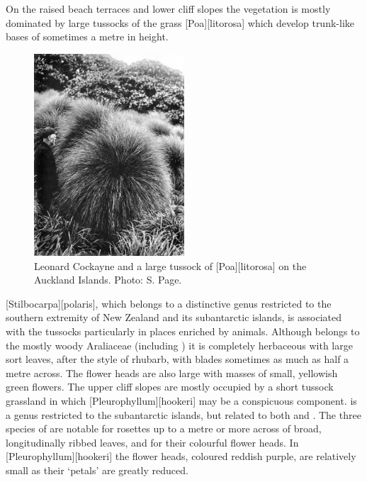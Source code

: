 On the raised beach terraces and lower cliff slopes the vegetation is mostly dominated by large tussocks of the grass [Poa][litorosa] which develop trunk-like bases of sometimes a metre in height.
\begin{figure}
	\includegraphics[width=0.5\textwidth]{graphics/fig_115}
	\centering
	\caption[Leonard Cockayne and a large tussock]{Leonard Cockayne and a large tussock of [Poa][litorosa] on the Auckland Islands.
	Photo: S. Page.}%
	\label{fig:115cockayne}
\end{figure}
[Stilbocarpa][polaris], which belongs to a distinctive genus restricted to the southern extremity of New Zealand and its subantarctic islands, is associated with the tussocks particularly in places enriched by animals.
Although  belongs to the mostly woody Araliaceae (including ) it is completely herbaceous with large sort leaves, after the style of rhubarb, with blades sometimes as much as half a metre across.
The flower heads are also large with masses of small, yellowish green flowers.
The upper cliff slopes are mostly occupied by a short tussock grassland in which [Pleurophyllum][hookeri] may be a conspicuous component.
 is a genus restricted to the subantarctic islands, but related to both  and .
The three species of  are notable for rosettes up to a metre or more across of broad, longitudinally ribbed leaves, and for their colourful flower heads.
In [Pleurophyllum][hookeri] the flower heads, coloured reddish purple, are relatively small as their `petals' are greatly reduced.

